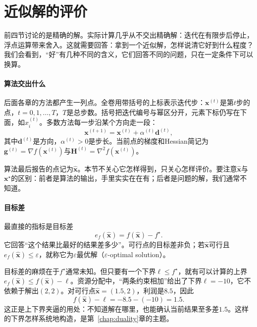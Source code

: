 \section{近似解的评价}
\label{sec:opt-approximate}

前四节讨论的是精确的解。实际计算几乎从不交出精确解：迭代在有限步后停止，浮点运算带来舍入。这就需要回答：拿到一个近似解，怎样说清它好到什么程度？我们会看到，“好”有几种不同的含义，它们回答不同的问题，只在一定条件下可以换算。

\paragraph{算法交出什么}
后面各章的方法都产生一列点。全卷用带括号的上标表示迭代步：$\bm{x}^{(t)}$是第$t$步的点，$t=0,1,\ldots,T$，$T$是总步数。括号把迭代编号与幂区分开，元素下标仍写在下面，如$x_i^{(t)}$。多数方法每一步沿某个方向走一段：
\begin{equation}
 \bm{x}^{(t+1)}=\bm{x}^{(t)}+\alpha^{(t)}\bm{d}^{(t)},
 \label{eq:opt-iteration}
\end{equation}
其中$\bm{d}^{(t)}$是方向，$\alpha^{(t)}>0$是步长。当前点的梯度和Hessian简记为$\bm{g}^{(t)}=\nabla f(\bm{x}^{(t)})$与$\bm{H}^{(t)}=\nabla^2f(\bm{x}^{(t)})$。

算法最后报告的点记为$\hat{\bm{x}}$。本节不关心它怎样得到，只关心怎样评价。要注意$\hat{\bm{x}}$与$\bm{x}^\star$的区别：前者是算法的输出，手里实实在在有；后者是问题的解，我们通常不知道。

\paragraph{目标差}
最直接的指标是目标差
\begin{equation}
 e_f(\hat{\bm{x}})=f(\hat{\bm{x}})-f^\star.
 \label{eq:opt-objective-gap}
\end{equation}
它回答“这个结果比最好的结果差多少”。可行点的目标差非负；若$\hat{\bm{x}}$可行且$e_f(\hat{\bm{x}})\leq\varepsilon$，就称它为$\varepsilon$最优解（$\varepsilon$-optimal solution）。

目标差的麻烦在于$f^\star$通常未知。但只要有一个下界$\ell\leq f^\star$，就有可以计算的上界$e_f(\hat{\bm{x}})\leq f(\hat{\bm{x}})-\ell$。资源分配中，“两条约束相加”给出了下界$\ell=-10$，它不依赖于解出$(2,2)$。对可行点$\hat{\bm{x}}=(1.5,2)$，利润是$8.5$，因此
\[
 f(\hat{\bm{x}})-\ell=-8.5-(-10)=1.5.
\]
这正是上下界夹逼的用处：不知道解在哪里，也能确认当前结果至多差$1.5$。这样的下界怎样系统地构造，是第~\ref{chap:duality}章的主题。

